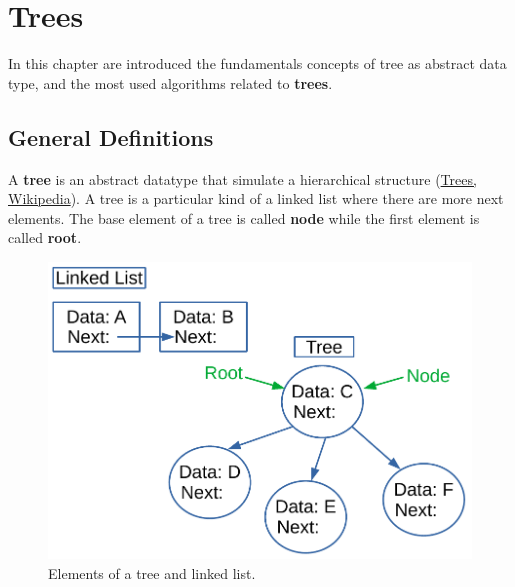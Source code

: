 \chapter{Trees}
\label{chp:trees}
In this chapter are introduced the fundamentals concepts of tree as abstract data type, and the most used algorithms related to \textbf{trees}.

\section{General Definitions}
A \textbf{tree} is an abstract datatype that simulate a hierarchical structure \cite{wikitrees} (\href{https://en.wikipedia.org/wiki/Tree_(data_structure)}{Trees, Wikipedia}). A tree is a particular kind of a linked list where there are more next elements. The base element of a tree is called \textbf{node} while the first element is called \textbf{root}.

\begin{figure}[H]
	\begin{center}
		\includegraphics[scale=.6]{chapters/trees/images/trees_1.pdf}
		\caption[Elements of a tree and linked list.]{Elements of a tree and linked list.}
		\label{trees_1}
	\end{center}
\end{figure}


